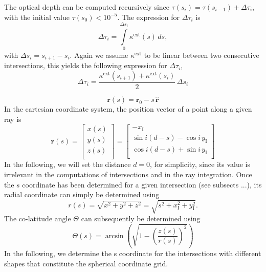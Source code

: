 \documentclass{report}
\newcommand{\rhat}{\hat{\bm{r}}}
\newcommand{\ro}{\bm{r}_0}
\newcommand{\rv}{\bm{r}}
\newcommand{\Dtau}{\Delta \tau}
\newcommand{\kext}{\kappa^\mathrm{ext}}
\newcommand{\cosi}{\cos{i}}
\newcommand{\sini}{\sin{i}}
\newcommand{\xI}{x_\mathrm{I}}
\newcommand{\yI}{y_\mathrm{I}}
\begin{document}
  The optical depth can be computed recursively since $\tau\left(s_i\right) = \tau \left( s_{i-1} \right) + \Dtau_i$, with the initial value $\tau\left(s_0\right) < 10^{-5}$. The expression for $\Dtau_i$ is
  \begin{equation}
        \Dtau_i = \int\limits_0^{\Delta s_i} \kext\left(s\right) \, ds,
  \end{equation}
  with $\Delta s_i = s_{i+1} - s_i$. Again we assume $\kext$ to be linear between two consecutive intersections, this yields the following expression for $\Dtau_i$,
  \begin{equation}
      \Dtau_i = \frac{\kext\left(s_{i+1}\right) + \kext\left(s_{i}\right)}{2} \, \Delta s_i
  \end{equation}
  
  \begin{equation}
      \rv\left(s\right) = \ro - s \, \rhat
  \end{equation}
  In the cartesian coordinate system, the position vector of a point along a given ray is
  \begin{equation}
      \rv\left(s\right) =
      \begin{bmatrix}   
      x(s) \\
      y(s) \\
      z(s) \\
      \end{bmatrix}
      =
      \begin{bmatrix}
      - \xI \\
      \sini \left(d - s\right) - \cosi \, \yI \\
      \cosi \left(d - s\right) + \sini \, \yI \\ 
      \end{bmatrix}
      \label{eq:ray}
  \end{equation}
  In the following, we will set the distance $d = 0$, for simplicity, since its value is irrelevant in the computations of intersections and in the ray integration. Once the $s$ coordinate has been determined for a given intersection (see subsects ...), its radial coordinate can simply be determined using 
  \begin{equation}
      r(s) = \sqrt{x^2 + y^2 + z^2} = \sqrt{s^2 + \xI^2 + \yI^2}.
  \end{equation}
  The co-latitude angle $\Theta$ can subsequently be determined using
  \begin{equation}
      \Theta(s) = \arcsin{\left( \sqrt{1 - \left(\frac{z(s)}{r(s)}\right)^2}\right)}
  \end{equation}
  In the following, we determine the s coordinate for the intersections with different shapes that constitute the spherical coordinate grid.
  
\end{document}

